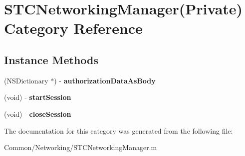 \hypertarget{category_s_t_c_networking_manager_07_private_08}{}\section{S\+T\+C\+Networking\+Manager(Private) Category Reference}
\label{category_s_t_c_networking_manager_07_private_08}
\subsection*{Instance Methods}
\begin{DoxyCompactItemize}
\item 
\hypertarget{category_s_t_c_networking_manager_07_private_08_a11b73aa5a98da4b229da67677dd0452c}{}\label{category_s_t_c_networking_manager_07_private_08_a11b73aa5a98da4b229da67677dd0452c} 
(N\+S\+Dictionary $\ast$) -\/ {\bfseries authorization\+Data\+As\+Body}
\item 
\hypertarget{category_s_t_c_networking_manager_07_private_08_a94bdf413a9252252f37e7de57726be14}{}\label{category_s_t_c_networking_manager_07_private_08_a94bdf413a9252252f37e7de57726be14} 
(void) -\/ {\bfseries start\+Session}
\item 
\hypertarget{category_s_t_c_networking_manager_07_private_08_a322df895f695905bd7cf61e14bb7b2f4}{}\label{category_s_t_c_networking_manager_07_private_08_a322df895f695905bd7cf61e14bb7b2f4} 
(void) -\/ {\bfseries close\+Session}
\end{DoxyCompactItemize}


The documentation for this category was generated from the following file\+:\begin{DoxyCompactItemize}
\item 
Common/\+Networking/S\+T\+C\+Networking\+Manager.\+m\end{DoxyCompactItemize}
